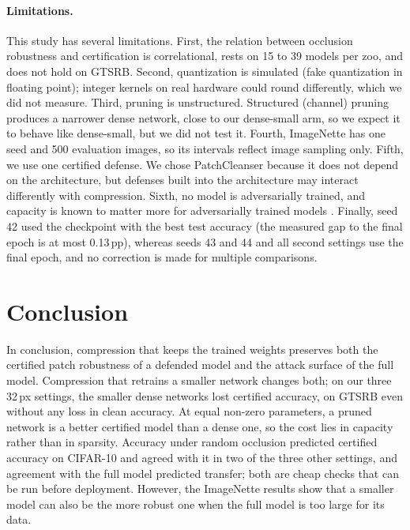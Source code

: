 \documentclass[10pt]{article}
\newcommand{\pp}{\,pp}
\begin{document}
\paragraph{Limitations.} This study has several limitations. First, the relation between occlusion robustness and
certification is correlational, rests on 15 to 39 models per zoo, and does not hold on GTSRB. Second, quantization is
simulated (fake quantization in floating point); integer kernels on real hardware could round differently, which we did not
measure. Third, pruning is unstructured. Structured (channel) pruning produces a narrower dense network, close to our
dense-small arm, so we expect it to behave like dense-small, but we did not test it. Fourth, ImageNette has one seed and
500 evaluation images, so its intervals reflect image sampling only. Fifth, we use one certified defense. We chose
PatchCleanser because it does not depend on the architecture, but defenses built into the architecture
\citep{xiang2021patchguard,salman2022certified} may interact differently with compression. Sixth, no model is
adversarially trained, and capacity is known to matter more for adversarially trained models \citep{sehwag2020hydra}.
Finally, seed 42 used the checkpoint with the best test accuracy (the measured gap to the final epoch is at most 0.13\pp),
whereas seeds 43 and 44 and all second settings use the final epoch, and no correction is made for multiple comparisons.

\section{Conclusion}
\label{sec:conclusion}

In conclusion, compression that keeps the trained weights preserves both the certified patch robustness of a defended
model and the attack surface of the full model. Compression that retrains a smaller network changes both; on our three
32\,px settings, the smaller dense networks lost certified accuracy, on GTSRB even without any loss in clean accuracy. At equal non-zero parameters, a pruned network is a
better certified model than a dense one, so the cost lies in capacity rather than in sparsity. Accuracy under random
occlusion predicted certified accuracy on CIFAR-10 and agreed with it in two of the three other settings, and agreement
with the full model predicted transfer; both are cheap checks that can be run before deployment. However, the ImageNette results show that a smaller
model can also be the more robust one when the full model is too large for its data.
\end{document}
